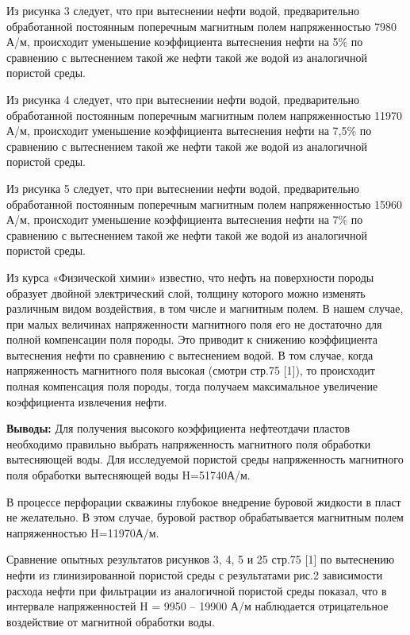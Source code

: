 \begin{multicols}{2}
Из рисунка 3 следует, что при вытеснении нефти водой, предварительно
обработанной постоянным поперечным магнитным полем напряженностью 7980
А/м, происходит уменьшение коэффициента вытеснения нефти на 5\% по
сравнению с вытеснением такой же нефти такой же водой из аналогичной
пористой среды.

Из рисунка 4 следует, что при вытеснении нефти водой, предварительно
обработанной постоянным поперечным магнитным полем напряженностью 11970
А/м, происходит уменьшение коэффициента вытеснения нефти на 7,5\% по
сравнению с вытеснением такой же нефти такой же водой из аналогичной
пористой среды.

Из рисунка 5 следует, что при вытеснении нефти водой, предварительно
обработанной постоянным поперечным магнитным полем напряженностью 15960
А/м, происходит уменьшение коэффициента вытеснения нефти на 7\% по
сравнению с вытеснением такой же нефти такой же водой из аналогичной
пористой среды.

Из курса «Физической химии» известно, что нефть на поверхности породы
образует двойной электрический слой, толщину которого можно изменять
различным видом воздействия, в том числе и магнитным полем. В нашем
случае, при малых величинах напряженности магнитного поля его не
достаточно для полной компенсации поля породы. Это приводит к снижению
коэффициента вытеснения нефти по сравнению с вытеснением водой. В том
случае, когда напряженность магнитного поля высокая (смотри стр.75
{[}1{]}), то происходит полная компенсация поля породы, тогда получаем
максимальное увеличение коэффициента извлечения нефти.

{\bfseries Выводы:} Для получения высокого коэффициента нефтеотдачи пластов
необходимо правильно выбрать напряженность магнитного поля обработки
вытесняющей воды. Для исследуемой пористой среды напряженность
магнитного поля обработки вытесняющей воды H=51740А/м.

В процессе перфорации скважины глубокое внедрение буровой жидкости в
пласт не желательно. В этом случае, буровой раствор обрабатывается
магнитным полем напряженностью H=11970А/м.

Сравнение опытных результатов рисунков 3, 4, 5 и 25 стр.75 {[}1{]} по
вытеснению нефти из глинизированной пористой среды с результатами рис.2
зависимости расхода нефти при фильтрации из аналогичной пористой среды
показал, что в интервале напряженностей H = 9950 -- 19900 А/м
наблюдается отрицательное воздействие от магнитной обработки воды.
\end{multicols}

